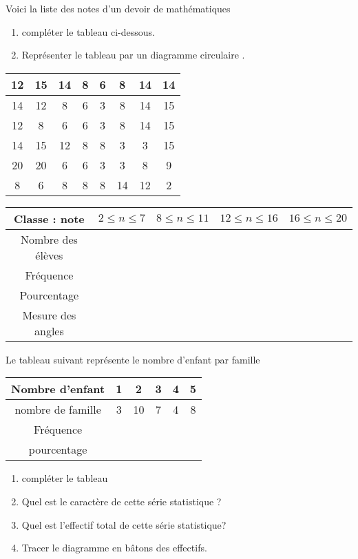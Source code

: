 \documentclass[a4paper,12pt]{article}
\begin{document}
\devoir[sem=2,prv=true,ds=true,num=6 ,niv=1 ,date=22/05/2023]


\begin{exo}
\begin{minipage}{.6\linewidth}
Voici la liste des notes d'un devoir de mathématiques 
\begin{enumerate}
\item compléter le tableau ci-dessous.
\item Représenter le tableau par un diagramme circulaire .
\end{enumerate}
\end{minipage}
\begin{tabular}{c|c|c|c|c|c|c|c}
12 & 15 & 14 & 8 & 6 & 8 & 14 & 14	 \\ 
\hline 
14 & 12 & 8 & 6 & 3 & 8 & 14 & 15	 \\ 
\hline 
12 & 8 & 6 & 6 & 3 & 8 & 14 & 15	 \\ 
\hline 
14 & 15 & 12 & 8 & 8 & 3 & 3 & 15 \\ 
\hline 
20 & 20 & 6 & 6 & 3 & 3 & 8 & 9 \\ 
\hline 
8 & 6 & 8 & 8 & 8 & 14 & 12 & 2 \\ 
\end{tabular} 

\begin{tabular}{|c|c|c|c|c|}
\hline 
Classe : note  & $2\leq n \leq 7$ & $8\leq n \leq 11$ &$12\leq n \leq 16$ & $16\leq n \leq 20$ \\ 
\hline 
Nombre des élèves &  &  &  &  \\ 
\hline 
Fréquence&  &  &  &  \\ 
\hline 
Pourcentage &  &  &  &  \\ 
\hline 
Mesure des angles &  &  &  &  \\ 
\hline 
\end{tabular} 
\end{exo}

\begin{exo}
Le tableau suivant représente le nombre d'enfant par famille

\begin{tabular}{|c|c|c|c|c|c|}
\hline 
Nombre d'enfant & 1 & 2 & 3 & 4 & 5 \\ 
\hline 
nombre de famille & 3 & 10 & 7 & 4 & 8 \\ 
\hline 
Fréquence  &  &  &  &  &  \\ 
\hline 
pourcentage &  &  &  &  &  \\ 
\hline 
\end{tabular} 
\begin{enumerate}
\item compléter le tableau
\item Quel est le caractère de cette série statistique ?
\item Quel est l'effectif total de cette série statistique?
\item Tracer le diagramme en bâtons des effectifs.
\end{enumerate}
\end{exo}
\end{document}
